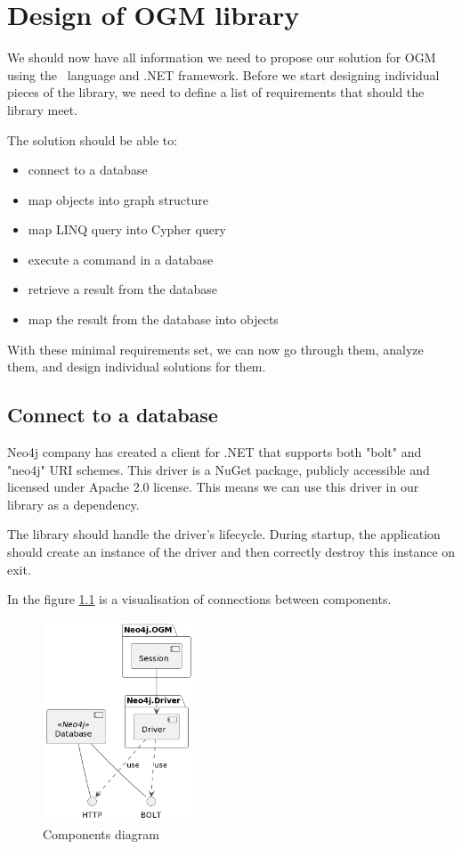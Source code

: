 \chapter {Design of OGM library}

We should now have all information we need to propose our solution for OGM using the \CS\ language and .NET framework.
Before we start designing individual pieces of the library, we need to define a list of requirements that should the library meet.

The solution should be able to:
\begin{itemize}
    \item {connect to a database}
    \item {map objects into graph structure}
    \item {map LINQ query into Cypher query}
    \item {execute a command in a database}
    \item {retrieve a result from the database}
    \item {map the result from the database into objects}
\end{itemize}

With these minimal requirements set, we can now go through them, analyze them, and design individual solutions for them.

\section{Connect to a database}

Neo4j company has created a client for .NET that supports both "bolt" and "neo4j" URI schemes. \cite{neo4j_client_nodate}
This driver is a NuGet package, publicly accessible and licensed under Apache 2.0 license.
This means we can use this driver in our library as a dependency.

The library should handle the driver's lifecycle.
During startup, the application should create an instance of the driver and then correctly destroy this instance on exit.

In the figure \ref{fig:components} is a visualisation of connections between components.

\begin{figure}[H]
    \centering
    \includegraphics[width=0.4\textwidth]{content/components.png}
    \caption{Components diagram}
    \label{fig:components}
\end{figure}

